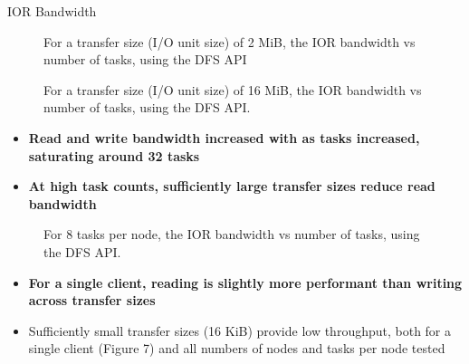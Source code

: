\documentclass[final]{beamer}
\newlength{\colwidth}
\begin{document}
\begin{frame}[t, fragile]
\begin{columns}[t]
\begin{column}{\colwidth}
\begin{block}{IOR Bandwidth}
    \begin{figure}
      \centering
         
      \caption{For a transfer size (I/O unit size) of 2 MiB, the IOR bandwidth vs number of tasks, using the DFS API}
      \label{fig:ior_bw-vs-tasks_hue-nodes_2M}
    \end{figure}
    \begin{figure}
      \centering
         
      \caption{For a transfer size (I/O unit size) of 16 MiB, the IOR bandwidth vs number of tasks, using the DFS API.}
      \label{fig:ior_bw-vs-tasks_hue-nodes_16M}
    \end{figure}
    \normalsize{
    \begin{itemize}
      \item \textbf{Read and write bandwidth increased with as tasks increased, saturating around 32 tasks}
      \item \textbf{At high task counts, sufficiently large transfer sizes reduce read bandwidth}
    \end{itemize}
    }


    \begin{figure}
      \centering
         
      \caption{For 8 tasks per node, the IOR bandwidth vs number of tasks, using the DFS API.}
    \end{figure}
    \normalsize{
    \begin{itemize}
      \item \textbf{For a single client, reading is slightly more performant than writing across transfer sizes}
      \item Sufficiently small transfer sizes (16 KiB) provide low throughput, both for a single client (Figure 7) and all numbers of nodes and tasks per node tested
    \end{itemize}
    }
    

\end{block}
\end{column}
\end{columns}
\end{frame}
\end{document}
